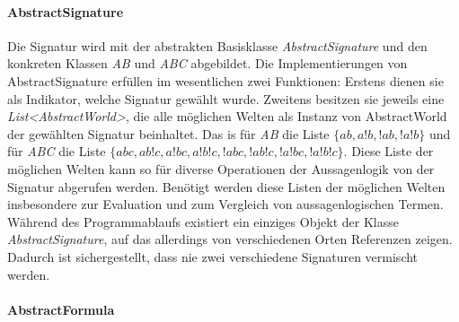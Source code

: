 \documentclass[12pt,a4paper]{article}
\begin{document}
\paragraph{AbstractSignature} \mbox{}

Die Signatur wird mit der abstrakten Basisklasse \textit{AbstractSignature} und den konkreten Klassen \textit{AB} und \textit{ABC} abgebildet. Die Implementierungen von AbstractSignature erfüllen im wesentlichen zwei Funktionen: Erstens dienen sie als Indikator, welche Signatur gewählt wurde. Zweitens besitzen sie jeweils eine \textit{List<AbstractWorld>}, die alle möglichen Welten als Instanz von AbstractWorld der gewählten Signatur beinhaltet. Das is für \textit{AB} die Liste $\{ab, a!b, !ab, !a!b\}$ und für \textit{ABC} die Liste $\{abc, ab!c, a!bc, a!b!c, !abc, !ab!c, !a!bc, !a!b!c\}$. Diese Liste der möglichen Welten kann so für diverse Operationen der Aussagenlogik von der Signatur abgerufen werden. Benötigt werden diese Listen der möglichen Welten insbesondere zur Evaluation und zum Vergleich von aussagenlogischen Termen. Während des Programmablaufs existiert ein einziges Objekt der Klasse \textit{AbstractSignature}, auf das allerdings von verschiedenen Orten Referenzen zeigen. Dadurch ist sichergestellt, dass nie zwei verschiedene Signaturen vermischt werden.

\paragraph{AbstractFormula} \mbox{}
\end{document}
